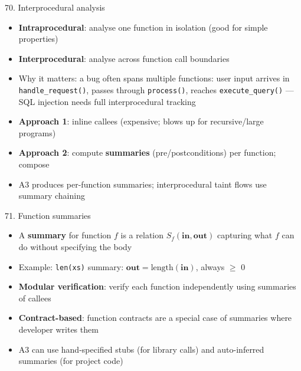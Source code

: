 \documentclass[aspectratio=169]{beamer}
\begin{document}
\begin{frame}{70. Interprocedural analysis}
\begin{itemize}
  \item \textbf{Intraprocedural}: analyse one function in isolation (good for simple properties)
  \item \textbf{Interprocedural}: analyse across function call boundaries
  \item Why it matters: a bug often spans multiple functions:
    user input arrives in \texttt{handle\_request()}, passes through \texttt{process()}, reaches \texttt{execute\_query()} ---
    SQL injection needs full interprocedural tracking
  \item \textbf{Approach 1}: inline callees (expensive; blows up for recursive/large programs)
  \item \textbf{Approach 2}: compute \textbf{summaries} (pre/postconditions) per function; compose
  \item A3 produces per-function summaries; interprocedural taint flows use summary chaining
\end{itemize}
\end{frame}

\begin{frame}{71. Function summaries}
\begin{itemize}
  \item A \textbf{summary} for function \(f\) is a relation \(S_f(\textbf{in}, \textbf{out})\) capturing what \(f\) can do without specifying the body
  \item Example: \texttt{len(xs)} summary: \(\textbf{out} = \text{length}(\textbf{in})\), always $\ge$ 0
  \item \textbf{Modular verification}: verify each function independently using summaries of callees
  \item \textbf{Contract-based}: function contracts are a special case of summaries where developer writes them
  \item A3 can use hand-specified stubs (for library calls) and auto-inferred summaries (for project code)
\end{itemize}
\end{frame}
\end{document}
